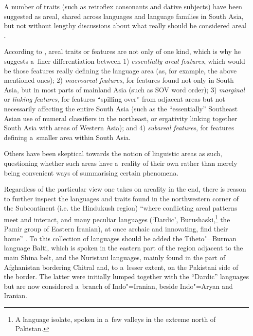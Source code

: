 A number of traits (such as retroflex consonants and dative subjects) have been suggested as areal, shared across languages and language families in South Asia, but not without lengthy discussions about what really should be considered areal \citep{emeneau1965,emeneau1980,masica1976,masica1991,masica2001,ebert2006}.


According to \citet{masica2001}, areal traits or features are not only of one kind, which is why he suggests a~finer differentiation between 1) \textit{essentially areal features}, which would be those features really defining the language area (as, for example, the above mentioned ones); 2) \textit{macroareal features}, for features found not only in South Asia, but in most parts of mainland Asia (such as SOV word order); 3) \textit{marginal} or \textit{linking features}, for features ``spilling over'' from adjacent areas but not necessarily affecting the entire South Asia (such as the ``essentially'' Southeast Asian use of numeral classifiers in the northeast, or ergativity linking together South Asia with areas of Western Asia); and 4) \textit{subareal features}, for features defining a~smaller area within South Asia.


Others \citep{dahl2001,ktammwaelchli2001} have been skeptical towards the notion of linguistic areas as such, questioning whether such areas have a~reality of their own rather than merely being convenient ways of summarising certain phenomena. 


Regardless of the particular view one takes on areality in the end, there is reason to further inspect the languages and traits found in the northwestern corner of the Subcontinent (i.e. the Hindukush region) ``where conflicting areal patterns meet and interact, and many peculiar languages (`Dardic', Burushaski,\footnote{A language isolate, spoken in a~few valleys in the extreme north of Pakistan.} the Pamir group of Eastern Iranian), at once archaic and innovating, find their home'' \citep[225]{masica2001}. To this collection of languages should be added the Tibeto"=Burman language Balti, which is spoken in the eastern part of the region adjacent to the main Shina belt, and the Nuristani languages, mainly found in the part of Afghanistan bordering Chitral and, to a~lesser extent, on the Pakistani side of the border. The latter were initially lumped together with the ``Dardic'' languages but are now considered a~branch of Indo"=Iranian, beside Indo"=Aryan and Iranian.


